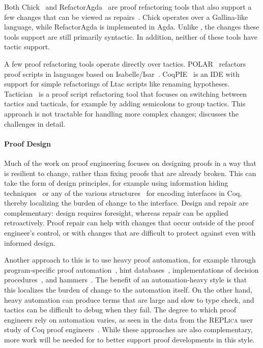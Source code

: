 Both Chick~\cite{robert2018} and RefactorAgda~\cite{wibergh2019} are proof refactoring tools that
also support a few changes that can be viewed as repairs~\cite{PGL-045}.
Chick operates over a Gallina-like language, while RefactorAgda is implemented in Agda.
Unlike \toolname, the changes these tools support are still primarily syntactic.
In addition, neither of these tools have tactic support.

A few proof refactoring tools operate directly over tactics.
POLAR~\cite{Dietrich2013} refactors proof scripts in languages based on Isabelle/Isar~\cite{Wenzel2007isar}.
CoqPIE~\cite{Roe2016} is an IDE with support for simple refactorings of Ltac scripts like renaming hypotheses.
Tactician~\cite{adams2015} is a proof script refactoring tool that focuses on switching between tactics and tacticals,
for example by adding semicolons to group tactics.
This approach is not tractable for handling more complex changes;
\citet{robert2018} discusses the challenges in detail.

\paragraph{Proof Design}

Much of the work on proof engineering focuses on designing proofs
in a way that is resilient to change, rather than fixing proofs that are already broken.
This can take the form of design principles, for example using 
information hiding techniques~\cite{Woos:2016:PCF:2854065.2854081, Klein:2014:CFV:2584468.2560537}
or any of the various structures~\cite{Chrzaszcz2003, Sozeau2008, Saibi:PhD} for encoding interfaces in Coq,
thereby localizing the burden of change to the interface.
Design and repair are complementary: design requires foresight, whereas repair can be applied retroactively.
Proof repair can help with changes that occur outside of the proof engineer's control,
or with changes that are difficult to protect against even with informed design.

Another approach to this is to use heavy proof automation, for example through
program-specific proof automation~\cite{Chlipala:2013:CPD:2584504},
hint databases~\cite{coq-intro}, implementations of decision procedures~\cite{Pugh1991},
and hammers~\cite{Blanchette2016b, Blanchette2013, Kaliszyk2014, Czajka2018}.
The benefit of an automation-heavy style is that this localizes the burden of change to the automation itself.
On the other hand, heavy automation can produce terms that are large and slow to type check,
and tactics can be difficult to debug when they fail.
The degree to which proof engineers rely on automation varies, as seen in the data from the
\textsc{REPLica} user study of Coq proof engineers~\cite{replica}.
While these approaches are also complementary, more work will be needed for \toolname to better support 
proof developments in this style.

